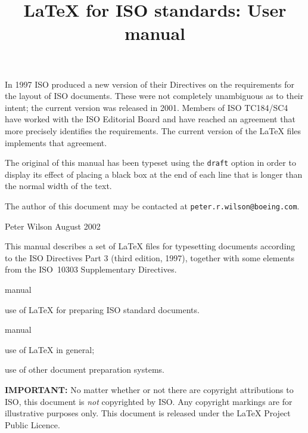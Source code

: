 \documentclass[wd,letterpaper,copyright]{isov2}
\makeatletter
\newcommand{\latex}{LaTeX}
\newcommand{\ixltx}{\index{latex@\latex}}
\makeatother
\begin{document}
\begin{introduction}
    In 1997 ISO produced a new version of their Directives on the 
requirements for the layout of ISO documents. These were not completely
unambiguous as to their intent; the current version was released in
2001. Members of ISO TC184/SC4 have worked with
the ISO Editorial Board and have reached an agreement that more precisely
identifies the requirements. The current version of the \latex{} files 
implements that agreement.

\begin{note}
The original of this manual has been typeset using the \verb?draft?
option in order to display its effect of placing a black box at the 
end of each line that is longer than the normal width of the text.
\end{note}

\begin{note}
The author of this document may be contacted at 
\texttt{peter.r.wilson@boeing.com}.
\end{note}

\end{introduction}

\title{LaTeX for ISO standards: User manual}%
{Peter Wilson}%
{August 2002}


\scopeclause

This manual describes a set of \ixltx\latex{} files for typesetting 
documents according to the ISO Directives Part 3 (third edition, 1997), 
together with some elements from the ISO~10303 Supplementary Directives.

\begin{inscope}{manual}
\item use of \latex{} for preparing ISO standard documents.
\end{inscope}

\begin{outofscope}{manual}
\item use of \latex{} in general;
\item use of other document preparation systems.
\end{outofscope}

\textbf{IMPORTANT:} No matter whether or not there are copyright attributions
to ISO, this document is \emph{not} copyrighted by ISO. Any copyright
markings are for illustrative purposes only. This document is released under
the LaTeX Project Public Licence.

\normrefsclause \label{sec:nrefs}
\end{document}

